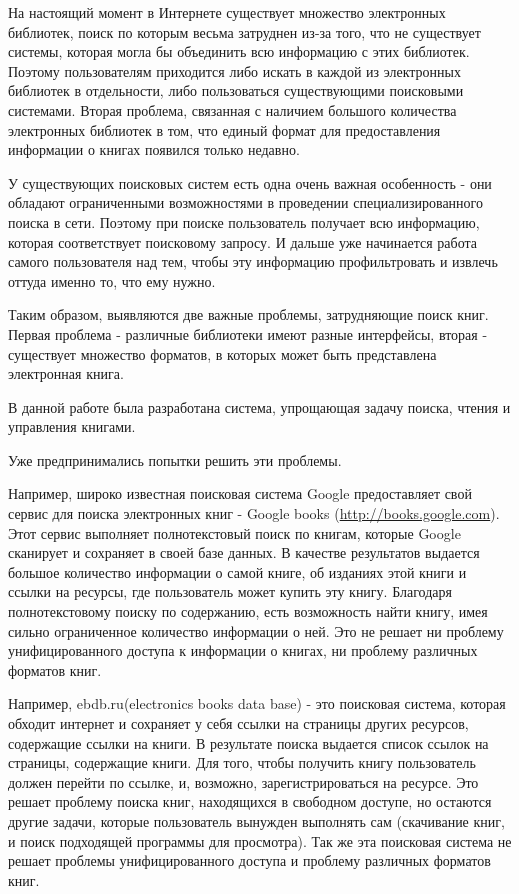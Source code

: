 \documentclass[a4paper]{report}
\begin{document}
На настоящий момент в Интернете существует множество электронных библиотек, поиск по которым весьма затруднен из-за того, что не существует системы, которая могла бы объединить всю информацию с этих библиотек. Поэтому пользователям приходится либо искать в каждой из электронных библиотек в отдельности, либо пользоваться существующими поисковыми системами. Вторая проблема, связанная с наличием большого количества электронных библиотек в том, что единый формат для предоставления информации о книгах появился только недавно. 

У существующих поисковых систем есть одна очень важная особенность - они обладают ограниченными возможностями в проведении специализированного поиска в сети. Поэтому при поиске пользователь получает всю информацию, которая соответствует поисковому запросу. И дальше уже начинается работа самого пользователя над тем, чтобы эту информацию профильтровать и извлечь оттуда именно то, что ему нужно. 

Таким образом, выявляются две важные проблемы, затрудняющие поиск книг. Первая проблема - различные библиотеки имеют разные интерфейсы, вторая - существует множество форматов, в которых может быть представлена электронная книга. 

В данной работе была разработана система, упрощающая задачу поиска, чтения и управления книгами. 



Уже предпринимались попытки решить эти проблемы.

Например, широко известная поисковая система Google предоставляет свой сервис для поиска электронных книг - Google books (\url{http://books.google.com}). Этот сервис выполняет полнотекстовый поиск по книгам, которые Google сканирует и сохраняет в своей базе данных. В качестве результатов выдается большое количество информации о самой книге, об изданиях этой книги и ссылки на ресурсы, где пользователь может купить эту книгу. Благодаря полнотекстовому поиску  по содержанию, есть возможность найти книгу, имея сильно ограниченное количество информации о ней. Это не решает ни проблему унифицированного доступа к информации о книгах, ни проблему различных форматов книг.

Например, ebdb.ru(electronics books data base)  - это поисковая система, которая обходит интернет и сохраняет у себя ссылки на страницы других ресурсов, содержащие ссылки на книги. В результате поиска выдается список ссылок на страницы, содержащие книги. Для того, чтобы получить книгу пользователь должен перейти по ссылке, и, возможно, зарегистрироваться на ресурсе. Это решает проблему поиска книг, находящихся в свободном доступе, но остаются другие задачи, которые пользователь вынужден выполнять сам (скачивание книг, и поиск подходящей программы для просмотра). Так же эта поисковая система не решает проблемы унифицированного доступа и проблему различных форматов книг.
\end{document}
